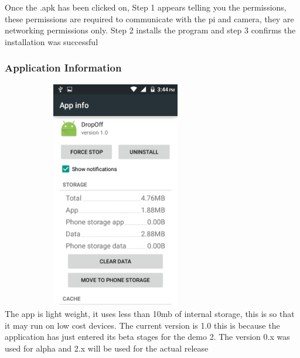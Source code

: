 \documentclass[a4paper,12pt]{article}
\begin{document}
			Once the .apk has been clicked on, Step 1 appears telling you the permissions, these permissions are required to communicate with the pi and camera, they are networking permissions only. Step 2 installs the program and step 3 confirms the installation was successful\newline\newline
			
			\subsubsection{Application Information}
			\includegraphics[width=10cm,height=10cm,keepaspectratio]{./Pictures/appinfo.png}\\
			The app is light weight, it uses less than 10mb of internal storage, this is so that it may run on low cost devices. The current version is 1.0 this is because the application has just entered its beta stages for the demo 2. The version 0.x was used for alpha and 2.x will be used for the actual release
			
\end{document}

